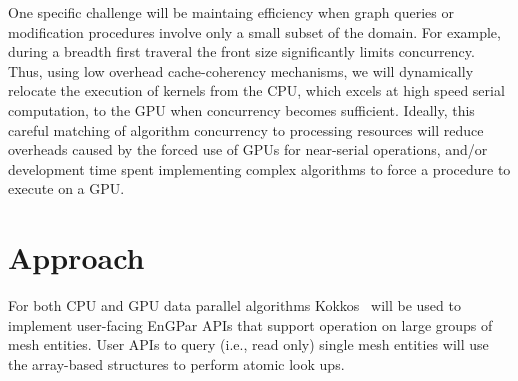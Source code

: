 \documentclass{article}
\begin{document}
One specific challenge will be maintaing efficiency when graph queries or
modification procedures involve only a small subset of the domain.
For example, during a breadth first traveral the front size significantly limits
concurrency.
Thus, using low overhead cache-coherency mechanisms, we will dynamically
relocate the execution of kernels from the CPU, which excels at high speed
serial computation, to the GPU when concurrency becomes sufficient.
Ideally, this careful matching of algorithm concurrency to processing resources
will reduce overheads caused by the forced use of GPUs for near-serial
operations, and/or development time spent implementing complex algorithms to
force a procedure to execute on a GPU.

\section{Approach}

For both CPU and GPU data parallel algorithms Kokkos~\cite{edwards2013kokkos}
will be used to implement user-facing EnGPar APIs that support operation on
large groups of mesh entities.
User APIs to query (i.e., read only) single mesh entities will use the
array-based structures to perform atomic look ups.
\end{document}
